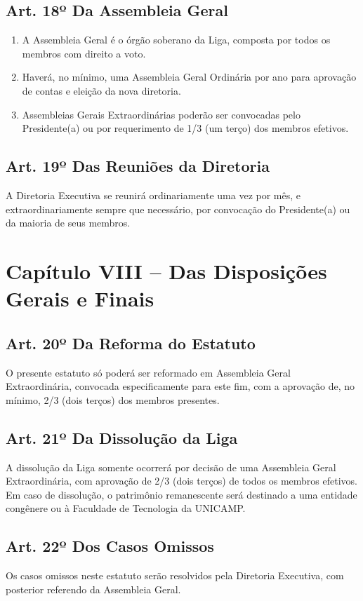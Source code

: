 \documentclass[12pt, a4paper]{article}
\begin{document}
\subsection{Art. 18º Da Assembleia Geral}
\begin{enumerate}[label=\S \arabic*.]
    \item A Assembleia Geral é o órgão soberano da Liga, composta por todos os membros com direito a voto.
    \item Haverá, no mínimo, uma Assembleia Geral Ordinária por ano para aprovação de contas e eleição da nova diretoria.
    \item Assembleias Gerais Extraordinárias poderão ser convocadas pelo Presidente(a) ou por requerimento de 1/3 (um terço) dos membros efetivos.
\end{enumerate}

\subsection{Art. 19º Das Reuniões da Diretoria}
A Diretoria Executiva se reunirá ordinariamente uma vez por mês, e extraordinariamente sempre que necessário, por convocação do Presidente(a) ou da maioria de seus membros.


\section{Capítulo VIII – Das Disposições Gerais e Finais}


\subsection{Art. 20º Da Reforma do Estatuto}
O presente estatuto só poderá ser reformado em Assembleia Geral Extraordinária, convocada especificamente para este fim, com a aprovação de, no mínimo, 2/3 (dois terços) dos membros presentes.

\subsection{Art. 21º Da Dissolução da Liga}
A dissolução da Liga somente ocorrerá por decisão de uma Assembleia Geral Extraordinária, com aprovação de 2/3 (dois terços) de todos os membros efetivos. Em caso de dissolução, o patrimônio remanescente será destinado a uma entidade congênere ou à Faculdade de Tecnologia da UNICAMP.

\subsection{Art. 22º Dos Casos Omissos}
Os casos omissos neste estatuto serão resolvidos pela Diretoria Executiva, com posterior referendo da Assembleia Geral.
\end{document}

